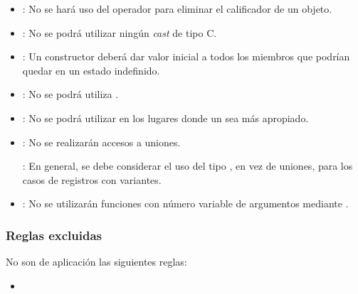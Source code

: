 \begin{itemize}

\item {}:
No se hará uso del operador  para eliminar
el calificador  de un objeto.

\item {}:
No se podrá utilizar ningún \emph{cast} de tipo C.

\item {}:
Un constructor deberá dar valor inicial a todos los miembros que podrían
quedar en un estado indefinido.

\item {}:
No se podrá utiliza .

\item {}:
No se podrá utilizar  en los lugares
donde un  sea más apropiado.

\item {}:
No se realizarán accesos a uniones.

: En general, se debe considerar el uso del tipo
, en vez de uniones, para los casos de registros
con variantes.

\item {}:
No se utilizarán funciones con número variable de argumentos mediante
.

\end{itemize}

\subsubsection{Reglas excluidas}

No son de aplicación las siguientes reglas:

\begin{itemize}

\item {}

\end{itemize}
